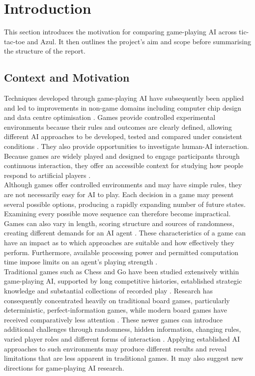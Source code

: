 \section{Introduction}
This section introduces the motivation for comparing game-playing AI across tic-tac-toe and Azul. It then outlines the project’s aim and scope before summarising the structure of the report.

\subsection{Context and Motivation}
Techniques developed through game-playing AI have subsequently been applied and led to improvements in non-game domains including computer chip design and data centre optimisation \cite{generaladvancements}. Games provide controlled experimental environments because their rules and outcomes are clearly defined, allowing different AI approaches to be developed, tested and compared under consistent conditions \cite{yannakakis2025artificial}. They also provide opportunities to investigate human-AI interaction. Because games are widely played and designed to engage participants through continuous interaction, they offer an accessible context for studying how people respond to artificial players \cite{humanaiinteraction}.\\

Although games offer controlled environments and may have simple rules, they are not necessarily easy for AI to play. Each decision in a game may present several possible options, producing a rapidly expanding number of future states. Examining every possible move sequence can therefore become impractical. Games can also vary in length, scoring structure and sources of randomness, creating different demands for an AI agent \cite{yannakakis2025artificial}. These characteristics of a game can have an impact as to which approaches are suitable and how effectively they perform. Furthermore, available processing power and permitted computation time impose limits on an agent's playing strength \cite{deepblue}.\\

Traditional games such as Chess and Go have been studied extensively within game-playing AI, supported by long competitive histories, established strategic knowledge and substantial collections of recorded play \cite{alphago}. Research has consequently concentrated heavily on traditional board games, particularly deterministic, perfect-information games, while modern board games have received comparatively less attention \cite{tagframework}. These newer games can introduce additional challenges through randomness, hidden information, changing rules, varied player roles and different forms of interaction \cite{tagframework}. Applying established AI approaches to such environments may produce different results and reveal limitations that are less apparent in traditional games. It may also suggest new directions for game-playing AI research. \\

